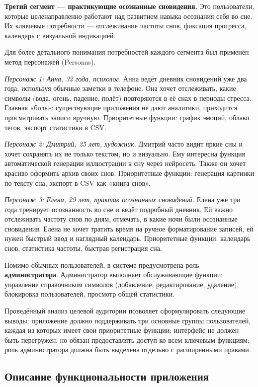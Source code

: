 \documentclass[14pt, a4paper]{extarticle}
\begin{document}
\textbf{Третий сегмент — практикующие осознанные сновидения.} 
Это пользователи, которые целенаправленно работают над развитием навыка 
осознания себя во сне. Их ключевые потребности — отслеживание частоты 
снов, фиксация прогресса, календарь с визуальной индикацией.

Для более детального понимания потребностей каждого сегмента 
был применён метод персонажей (Personas). 

\textit{Персонаж 1: Анна, 32 года, психолог.} Анна ведёт дневник 
сновидений уже два года, используя обычные заметки в телефоне. Она хочет 
отслеживать, какие символы (вода, огонь, падение, полёт) повторяются в её 
снах в периоды стресса. Главная «боль»: существующие приложения не дают 
аналитики, приходится просматривать записи вручную. Приоритетные функции: 
график эмоций, облако тегов, экспорт статистики в CSV.

\textit{Персонаж 2: Дмитрий, 25 лет, художник.} Дмитрий часто видит 
яркие сны и хочет сохранять их не только текстом, но 
и визуально. Ему интересна функция автоматической генерации иллюстрации 
к сну через нейросеть. Также он хочет красиво оформить архив своих снов. 
Приоритетные функции: генерация картинки по тексту сна, экспорт в CSV как 
«книга снов».

\textit{Персонаж 3: Елена, 29 лет, практик осознанных сновидений.} 
Елена уже три года тренирует осознанность во сне и ведёт подробный 
дневник. Ей важно отслеживать частоту снов по дням, отмечать, в какие 
ночи были осознанные сновидения. Елена не хочет тратить время на ручное 
форматирование записей, ей нужен быстрый ввод и наглядный календарь. 
Приоритетные функции: календарь снов, статистика частоты, быстрая 
регистрация сна.

Помимо обычных пользователей, в системе предусмотрена роль 
\textbf{администратора}. Администратор выполняет обслуживающие функции: 
управление справочником символов (добавление, редактирование, удаление), 
блокировка пользователей, просмотр общей статистики.

Проведённый анализ целевой аудитории позволяет сформулировать 
следующие выводы: приложение должно поддерживать три основные группы 
пользователей, каждая из которых имеет свои приоритетные функции; 
интерфейс не должен быть перегружен, но обязан предоставлять доступ ко 
всем ключевым функциям; роль администратора должна быть выделена отдельно 
с расширенными правами.

\subsection{Описание функциональности приложения}
\end{document}
